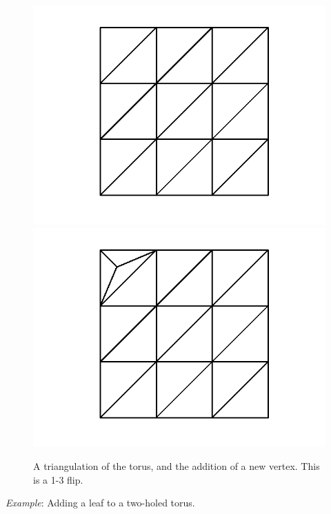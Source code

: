 \documentclass[12pt]{article}
\begin{document}
\begin{figure}[ht]
\includegraphics[scale = 0.5]{Pictures/torus22.png}
\includegraphics[scale = 0.5]{Pictures/torus2addvertex2.png}
\caption{A triangulation of the torus, and the addition of a new vertex. This is a 1-3 flip.}
\label{torusaddv}
\end{figure}

\noindent \textit{Example}: Adding a leaf to a two-holed torus.\newline
\end{document}

